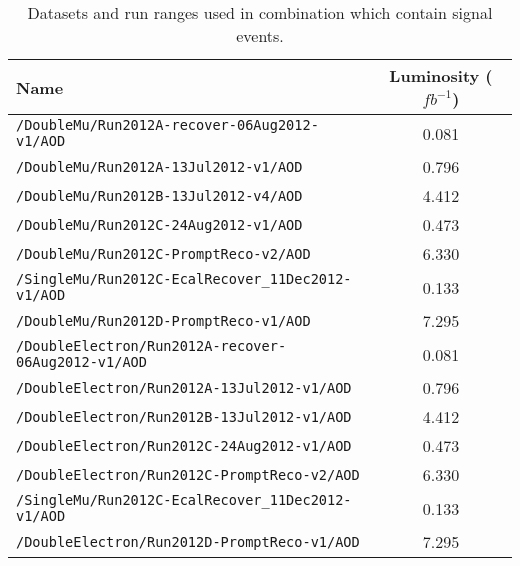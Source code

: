 \begin{table}[hbt]
\caption{\label{tab:DilDsets_lumi}Datasets and run ranges used in combination which contain signal events.}
\begin{center}
\begin{tabular}{lc}\hline\hline
Name		 & Luminosity ($fb^{-1}$) \\ \hline
\verb=/DoubleMu/Run2012A-recover-06Aug2012-v1/AOD=                  &  0.081 \\ 
\verb=/DoubleMu/Run2012A-13Jul2012-v1/AOD=                                         & 0.796               \\ 
\verb=/DoubleMu/Run2012B-13Jul2012-v4/AOD=                                          & 4.412             \\ 
\verb=/DoubleMu/Run2012C-24Aug2012-v1/AOD=                                 & 0.473\\  
\verb=/DoubleMu/Run2012C-PromptReco-v2/AOD=                                    & 6.330                \\ 
\verb=/SingleMu/Run2012C-EcalRecover_11Dec2012-v1/AOD=           & 0.133\\
\verb=/DoubleMu/Run2012D-PromptReco-v1/AOD=                                 &  7.295 \\

\verb=/DoubleElectron/Run2012A-recover-06Aug2012-v1/AOD=              & 0.081              \\ 
\verb=/DoubleElectron/Run2012A-13Jul2012-v1/AOD=                            & 0.796                    \\ 
\verb=/DoubleElectron/Run2012B-13Jul2012-v1/AOD=                           & 4.412\\ 
\verb=/DoubleElectron/Run2012C-24Aug2012-v1/AOD=                           & 0.473                 \\ 
\verb=/DoubleElectron/Run2012C-PromptReco-v2/AOD=                          & 6.330             \\ 
\verb=/SingleMu/Run2012C-EcalRecover_11Dec2012-v1/AOD=           & 0.133\\
\verb=/DoubleElectron/Run2012D-PromptReco-v1/AOD=                        &  7.295 \\


\end{tabular}
\end{center}
\end{table}
